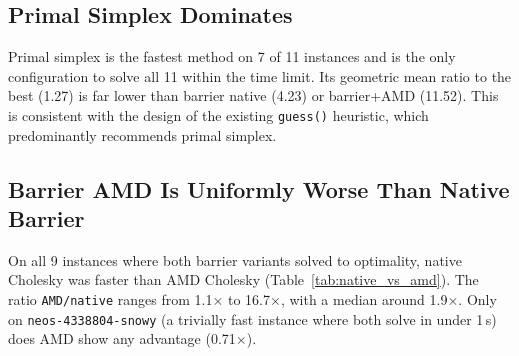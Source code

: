 \documentclass[11pt,a4paper]{article}
\begin{document}
\subsection{Primal Simplex Dominates}

Primal simplex is the fastest method on 7 of 11 instances and is the only
configuration to solve all 11 within the time limit.  Its geometric mean
ratio to the best (1.27) is far lower than barrier native (4.23) or
barrier+AMD (11.52).  This is consistent with the design of the existing
\texttt{guess()} heuristic, which predominantly recommends primal simplex.

\subsection{Barrier AMD Is Uniformly Worse Than Native Barrier}

On all 9 instances where both barrier variants solved to optimality, native
Cholesky was faster than AMD Cholesky (Table~\ref{tab:native_vs_amd}).
The ratio \texttt{AMD/native} ranges from 1.1$\times$ to 16.7$\times$, with
a median around 1.9$\times$.  Only on \texttt{neos-4338804-snowy} (a trivially
fast instance where both solve in under 1\,s) does AMD show any advantage (0.71$\times$).
\end{document}
